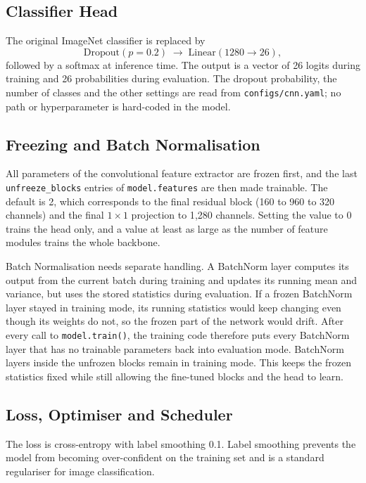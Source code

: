 \subsection{Classifier Head}

The original ImageNet classifier is replaced by
\begin{equation*}
  \text{Dropout}(p=0.2) \;\longrightarrow\; \text{Linear}(1280 \rightarrow 26),
\end{equation*}
followed by a softmax at inference time. The output is a vector of 26 logits during training and 26 probabilities during evaluation. The dropout probability, the number of classes and the other settings are read from \texttt{configs/cnn.yaml}; no path or hyperparameter is hard-coded in the model.

\subsection{Freezing and Batch Normalisation}
\label{sec:cnn-freezing}

All parameters of the convolutional feature extractor are frozen first, and the last \texttt{unfreeze\_blocks} entries of \texttt{model.features} are then made trainable. The default is 2, which corresponds to the final residual block (160 to 960 to 320 channels) and the final $1\times1$ projection to 1{,}280 channels. Setting the value to 0 trains the head only, and a value at least as large as the number of feature modules trains the whole backbone.

Batch Normalisation needs separate handling. A BatchNorm layer computes its output from the current batch during training and updates its running mean and variance, but uses the stored statistics during evaluation. If a frozen BatchNorm layer stayed in training mode, its running statistics would keep changing even though its weights do not, so the frozen part of the network would drift. After every call to \texttt{model.train()}, the training code therefore puts every BatchNorm layer that has no trainable parameters back into evaluation mode. BatchNorm layers inside the unfrozen blocks remain in training mode. This keeps the frozen statistics fixed while still allowing the fine-tuned blocks and the head to learn.

\subsection{Loss, Optimiser and Scheduler}

The loss is cross-entropy with label smoothing 0.1. Label smoothing prevents the model from becoming over-confident on the training set and is a standard regulariser for image classification.

